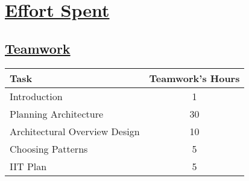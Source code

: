 \section[Effort Spent]{\hyperlink{toc}{Effort Spent}}
\label{sec:effortSpent}

\subsection[Teamwork]{\hyperlink{toc}{Teamwork}}
\vspace{2mm}
\begin{center}
	\begin{tabular}{| l | c |}
		\hline
		\textbf{Task} & \textbf{Teamwork's Hours} \\ \hline
		Introduction & 1 \\ \hline
		Planning Architecture & 30 \\ \hline
		Architectural Overview Design & 10 \\ \hline
		Choosing Patterns & 5 \\ \hline
		IIT Plan & 5 \\
		\hline	
	\end{tabular}
\end{center}

